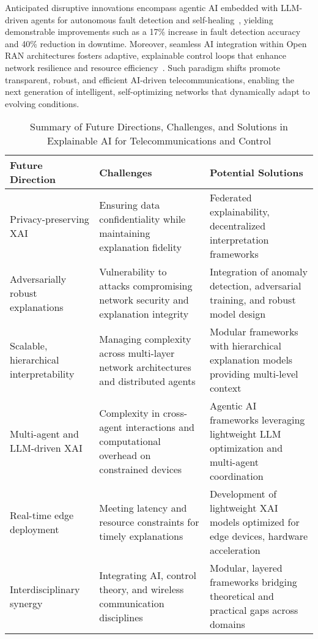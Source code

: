 \documentclass[sigconf]{acmart}
\begin{document}
Anticipated disruptive innovations encompass agentic AI embedded with LLM-driven agents for autonomous fault detection and self-healing~\cite{ref55}, yielding demonstrable improvements such as a 17\% increase in fault detection accuracy and 40\% reduction in downtime. Moreover, seamless AI integration within Open RAN architectures fosters adaptive, explainable control loops that enhance network resilience and resource efficiency~\cite{ref54}. Such paradigm shifts promote transparent, robust, and efficient AI-driven telecommunications, enabling the next generation of intelligent, self-optimizing networks that dynamically adapt to evolving conditions.

\begin{table*}[htbp]
\centering
\caption{Summary of Future Directions, Challenges, and Solutions in Explainable AI for Telecommunications and Control}
\label{tab:future-directions}
\begin{adjustbox}{max width=\textwidth}
\begin{tabular}{@{}lll@{}}
\toprule
\textbf{Future Direction} & \textbf{Challenges} & \textbf{Potential Solutions} \\ \midrule
Privacy-preserving XAI & Ensuring data confidentiality while maintaining explanation fidelity & Federated explainability, decentralized interpretation frameworks~\cite{ref48} \\[6pt]
Adversarially robust explanations & Vulnerability to attacks compromising network security and explanation integrity & Integration of anomaly detection, adversarial training, and robust model design~\cite{ref50, ref54} \\[6pt]
Scalable, hierarchical interpretability & Managing complexity across multi-layer network architectures and distributed agents & Modular frameworks with hierarchical explanation models providing multi-level context~\cite{ref55} \\[6pt]
Multi-agent and LLM-driven XAI & Complexity in cross-agent interactions and computational overhead on constrained devices & Agentic AI frameworks leveraging lightweight LLM optimization and multi-agent coordination~\cite{ref55} \\[6pt]
Real-time edge deployment & Meeting latency and resource constraints for timely explanations & Development of lightweight XAI models optimized for edge devices, hardware acceleration~\cite{ref54} \\[6pt]
Interdisciplinary synergy & Integrating AI, control theory, and wireless communication disciplines & Modular, layered frameworks bridging theoretical and practical gaps across domains \\ \bottomrule
\end{tabular}
\end{adjustbox}
\end{table*}
\end{document}
